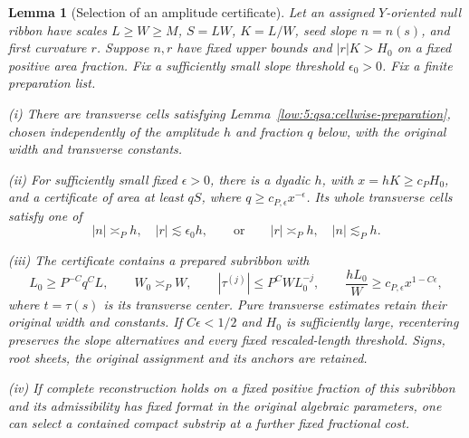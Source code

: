 \documentclass[11pt]{amsart}
\newtheorem{lemma}[theorem]{Lemma}
\theoremstyle{definition}
\theoremstyle{remark}
\numberwithin{equation}{section}
\begin{document}
\begin{lemma}[Selection of an amplitude certificate]\label{low:surface:amplitude-selection}
Let an assigned $Y$-oriented null ribbon have scales $L\ge W\ge M$, $S=LW$, $K=L/W$, seed slope $n=n(s)$, and first curvature $r$. Suppose $n,r$ have fixed upper bounds and $|r|K>H_0$ on a fixed positive area fraction. Fix a sufficiently small slope threshold $\epsilon_0>0$. Fix a finite preparation list.

\noindent\textup{(i)} There are transverse cells satisfying Lemma~\ref{low:5:qsa:cellwise-preparation}, chosen independently of the amplitude $h$ and fraction $q$ below, with the original width and transverse constants.

\noindent\textup{(ii)} For sufficiently small fixed $\epsilon>0$, there is a dyadic $h$, with $x=hK\ge c_PH_0$, and a certificate of area at least $qS$, where $q\ge c_{P,\epsilon}x^{-\epsilon}$. Its whole transverse cells satisfy one of
\[
|n|\asymp_Ph,\quad |r|\lesssim\epsilon_0h,
\qquad\text{or}\qquad
|r|\asymp_Ph,\quad |n|\lesssim_Ph.
\]

\noindent\textup{(iii)} The certificate contains a prepared subribbon with
\[
L_0\ge P^{-C}q^CL,\qquad W_0\asymp_PW,\qquad
|\tau^{(j)}|\le P^CW L_0^{-j},\qquad
\frac{hL_0}{W}\ge c_{P,\epsilon}x^{1-C\epsilon},
\]
where $t=\tau(s)$ is its transverse center. Pure transverse estimates retain their original width and constants. If $C\epsilon<1/2$ and $H_0$ is sufficiently large, recentering preserves the slope alternatives and every fixed rescaled-length threshold. Signs, root sheets, the original assignment and its anchors are retained.

\noindent\textup{(iv)} If complete reconstruction holds on a fixed positive fraction of this subribbon and its admissibility has fixed format in the original algebraic parameters, one can select a contained compact substrip at a further fixed fractional cost.
\end{lemma}
\end{document}
